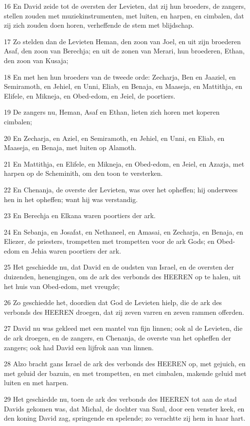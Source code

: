 \par 16 En David zeide tot de oversten der Levieten, dat zij hun broeders, de zangers, stellen zouden met muziekinstrumenten, met luiten, en harpen, en cimbalen, dat zij zich zouden doen horen, verheffende de stem met blijdschap.
\par 17 Zo stelden dan de Levieten Heman, den zoon van Joel, en uit zijn broederen Asaf, den zoon van Berechja; en uit de zonen van Merari, hun broederen, Ethan, den zoon van Kusaja;
\par 18 En met hen hun broeders van de tweede orde: Zecharja, Ben en Jaaziel, en Semiramoth, en Jehiel, en Unni, Eliab, en Benaja, en Maaseja, en Mattithja, en Elifele, en Mikneja, en Obed-edom, en Jeiel, de poortiers.
\par 19 De zangers nu, Heman, Asaf en Ethan, lieten zich horen met koperen cimbalen;
\par 20 En Zecharja, en Aziel, en Semiramoth, en Jehiel, en Unni, en Eliab, en Maaseja, en Benaja, met luiten op Alamoth.
\par 21 En Mattithja, en Elifele, en Mikneja, en Obed-edom, en Jeiel, en Azazja, met harpen op de Scheminith, om den toon te versterken.
\par 22 En Chenanja, de overste der Levieten, was over het opheffen; hij onderwees hen in het opheffen; want hij was verstandig.
\par 23 En Berechja en Elkana waren poortiers der ark.
\par 24 En Sebanja, en Josafat, en Nethaneel, en Amasai, en Zecharja, en Benaja, en Eliezer, de priesters, trompetten met trompetten voor de ark Gods; en Obed-edom en Jehia waren poortiers der ark.
\par 25 Het geschiedde nu, dat David en de oudsten van Israel, en de oversten der duizenden, henengingen, om de ark des verbonds des HEEREN op te halen, uit het huis van Obed-edom, met vreugde;
\par 26 Zo geschiedde het, doordien dat God de Levieten hielp, die de ark des verbonds des HEEREN droegen, dat zij zeven varren en zeven rammen offerden.
\par 27 David nu was gekleed met een mantel van fijn linnen; ook al de Levieten, die de ark droegen, en de zangers, en Chenanja, de overste van het opheffen der zangers; ook had David een lijfrok aan van linnen.
\par 28 Alzo bracht gans Israel de ark des verbonds des HEEREN op, met gejuich, en met geluid der bazuin, en met trompetten, en met cimbalen, makende geluid met luiten en met harpen.
\par 29 Het geschiedde nu, toen de ark des verbonds des HEEREN tot aan de stad Davids gekomen was, dat Michal, de dochter van Saul, door een venster keek, en den koning David zag, springende en spelende; zo verachtte zij hem in haar hart.

